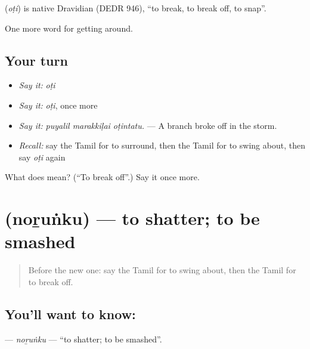 \begin{cousinweb}
\textbf{} (\emph{oṭi}) is native Dravidian (DEDR 946), \textquotedblleft{}to break, to break off, to snap\textquotedblright{}.
\end{cousinweb}

\begin{grammarlens}[title={What you've built}]
One more word for getting around.
\end{grammarlens}

\subsection*{Your turn}
\begin{itemize}
\raggedright
  \item \emph{Say it:} \emph{oṭi}
  \item \emph{Say it:} \emph{oṭi}, once more
  \item \emph{Say it:} \emph{puyalil marakkiḷai oṭintatu.} — A branch broke off in the storm.
  \item \emph{Recall:} say the Tamil for to surround, then the Tamil for to swing about, then say \emph{oṭi} again
\end{itemize}

\begin{tcolorbox}[breakable,colback=teal!4,colframe=teal!35!black,title={Before you move on}]
What does  mean? (\textquotedblleft{}To break off\textquotedblright{}.) Say it once more.
\end{tcolorbox}
\section[\texorpdfstring{\ta{நொறுங்கு} (noṟuṅku)}{நொறுங்கு (noṟuṅku)}]{ (noṟuṅku) — to shatter; to be smashed}

\label{lesson:TA-C443-norunku}



\begin{quote}
Before the new one: say the Tamil for to swing about, then the Tamil for to break off.
\end{quote}

\subsection*{You'll want to know: }
\textbf{} — \emph{noṟuṅku} — \textquotedblleft{}to shatter; to be smashed\textquotedblright{}.

